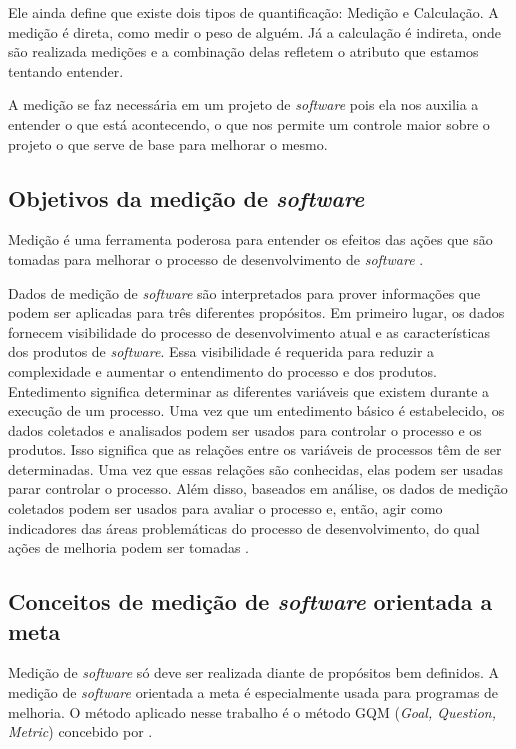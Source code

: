 Ele ainda define que existe dois tipos de quantificação: Medição e Calculação.
A medição é direta, como medir o peso de alguém. Já a calculação é indireta, onde
são realizada medições e a combinação delas refletem o atributo que estamos
tentando entender.

A medição se faz necessária em um projeto de \textit{software} pois ela nos auxilia a
entender o que está acontecendo, o que nos permite um controle maior sobre o
projeto o que serve de base para melhorar o mesmo.

\subsection{Objetivos da medição de \textit{software}}
Medição é uma ferramenta poderosa para entender os efeitos das ações que são
tomadas para melhorar o processo de desenvolvimento de \textit{software}
\cite{egon}.

Dados de medição de \textit{software} são interpretados para prover informações que podem
ser aplicadas para três diferentes propósitos. Em primeiro lugar, os dados
fornecem visibilidade do processo de desenvolvimento atual e as características
dos produtos de \textit{software}. Essa visibilidade é requerida para reduzir a complexidade
e aumentar o entendimento do processo e dos produtos. Entedimento significa
determinar as diferentes variáveis que existem durante a execução de um processo.
Uma vez que um entedimento básico é estabelecido, os dados coletados e analisados
podem ser usados para controlar o processo e os produtos. Isso significa que as
relações entre os variáveis de processos têm de ser determinadas. Uma vez que
 essas relações são conhecidas, elas podem ser usadas parar controlar o processo.
 Além disso, baseados em análise, os dados de medição coletados podem ser usados
 para avaliar o processo e, então, agir como indicadores das áreas problemáticas
 do processo de desenvolvimento, do qual ações de melhoria podem ser tomadas
 \cite{pfleeger}.

\subsection{Conceitos de medição de \textit{software} orientada a meta}
Medição de \textit{software} só deve ser realizada diante de propósitos bem definidos.
A medição de \textit{software} orientada a meta é especialmente usada para programas de
 melhoria. O método aplicado nesse trabalho é o método GQM (\textit{Goal, Question, Metric})
 concebido por \cite{basiliRombach}.

